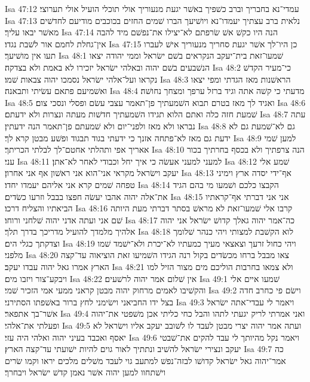 Isa 47:12  עמדי־נא בחבריך וברב כשׁפיך באשׁר יגעת מנעוריך אולי תוכלי הועיל אולי תערוצי׃
Isa 47:13  נלאית ברב עצתיך יעמדו־נא ויושׁיעך הברו שׁמים החזים בכוכבים מודיעם לחדשׁים מאשׁר יבאו עליך׃
Isa 47:14  הנה היו כקשׁ אשׁ שׂרפתם לא־יצילו את־נפשׁם מיד להבה אין־גחלת לחמם אור לשׁבת נגדו׃
Isa 47:15  כן היו־לך אשׁר יגעת סחריך מנעוריך אישׁ לעברו תעו אין מושׁיעך׃
Isa 48:1  שׁמעו־זאת בית־יעקב הנקראים בשׁם ישׂראל וממי יהודה יצאו הנשׁבעים בשׁם יהוה ובאלהי ישׂראל יזכירו לא באמת ולא בצדקה׃
Isa 48:2  כי־מעיר הקדשׁ נקראו ועל־אלהי ישׂראל נסמכו יהוה צבאות שׁמו׃
Isa 48:3  הראשׁנות מאז הגדתי ומפי יצאו ואשׁמיעם פתאם עשׂיתי ותבאנה׃
Isa 48:4  מדעתי כי קשׁה אתה וגיד ברזל ערפך ומצחך נחושׁה׃
Isa 48:5  ואגיד לך מאז בטרם תבוא השׁמעתיך פן־תאמר עצבי עשׂם ופסלי ונסכי צום׃
Isa 48:6  שׁמעת חזה כלה ואתם הלוא תגידו השׁמעתיך חדשׁות מעתה ונצרות ולא ידעתם׃
Isa 48:7  עתה נבראו ולא מאז ולפני־יום ולא שׁמעתם פן־תאמר הנה ידעתין׃
Isa 48:8  גם לא־שׁמעת גם לא ידעת גם מאז לא־פתחה אזנך כי ידעתי בגוד תבגוד ופשׁע מבטן קרא לך׃
Isa 48:9  למען שׁמי אאריך אפי ותהלתי אחטם־לך לבלתי הכריתך׃
Isa 48:10  הנה צרפתיך ולא בכסף בחרתיך בכור עני׃
Isa 48:11  למעני למעני אעשׂה כי איך יחל וכבודי לאחר לא־אתן׃
Isa 48:12  שׁמע אלי יעקב וישׂראל מקראי אני־הוא אני ראשׁון אף אני אחרון׃
Isa 48:13  אף־ידי יסדה ארץ וימיני טפחה שׁמים קרא אני אליהם יעמדו יחדו׃
Isa 48:14  הקבצו כלכם ושׁמעו מי בהם הגיד את־אלה יהוה אהבו יעשׂה חפצו בבבל וזרעו כשׂדים׃
Isa 48:15  אני אני דברתי אף־קראתיו הביאתיו והצליח דרכו׃
Isa 48:16  קרבו אלי שׁמעו־זאת לא מראשׁ בסתר דברתי מעת היותה שׁם אני ועתה אדני יהוה שׁלחני ורוחו׃
Isa 48:17  כה־אמר יהוה גאלך קדושׁ ישׂראל אני יהוה אלהיך מלמדך להועיל מדריכך בדרך תלך׃
Isa 48:18  לוא הקשׁבת למצותי ויהי כנהר שׁלומך וצדקתך כגלי הים׃
Isa 48:19  ויהי כחול זרעך וצאצאי מעיך כמעתיו לא־יכרת ולא־ישׁמד שׁמו מלפני׃
Isa 48:20  צאו מבבל ברחו מכשׂדים בקול רנה הגידו השׁמיעו זאת הוציאוה עד־קצה הארץ אמרו גאל יהוה עבדו יעקב׃
Isa 48:21  ולא צמאו בחרבות הוליכם מים מצור הזיל למו ויבקע־צור ויזבו מים׃
Isa 48:22  אין שׁלום אמר יהוה לרשׁעים׃
Isa 49:1  שׁמעו איים אלי והקשׁיבו לאמים מרחוק יהוה מבטן קראני ממעי אמי הזכיר שׁמי׃
Isa 49:2  וישׂם פי כחרב חדה בצל ידו החביאני וישׂימני לחץ ברור באשׁפתו הסתירני׃
Isa 49:3  ויאמר לי עבדי־אתה ישׂראל אשׁר־בך אתפאר׃
Isa 49:4  ואני אמרתי לריק יגעתי לתהו והבל כחי כליתי אכן משׁפטי את־יהוה ופעלתי את־אלהי׃
Isa 49:5  ועתה אמר יהוה יצרי מבטן לעבד לו לשׁובב יעקב אליו וישׂראל לא יאסף ואכבד בעיני יהוה ואלהי היה עזי׃
Isa 49:6  ויאמר נקל מהיותך לי עבד להקים את־שׁבטי יעקב ונצירי ישׂראל להשׁיב ונתתיך לאור גוים להיות ישׁועתי עד־קצה הארץ׃
Isa 49:7  כה אמר־יהוה גאל ישׂראל קדושׁו לבזה־נפשׁ למתעב גוי לעבד משׁלים מלכים יראו וקמו שׂרים וישׁתחוו למען יהוה אשׁר נאמן קדשׁ ישׂראל ויבחרך׃
